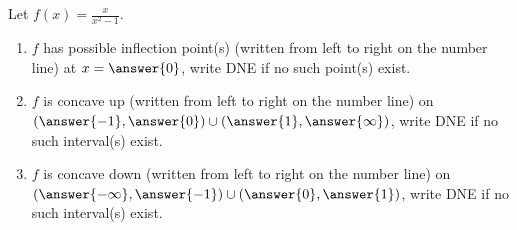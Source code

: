 \documentclass[handout]{ximera}
\author{Gregory Hartman \and Matthew Carr}
\begin{document}
\begin{exercise}






Let $f(x)=\frac{x}{x^2-1}$.
\begin{enumerate}
\item $f$ has possible inflection point(s) (written from left to right
  on the number line) at $x=\answer{0}$, write DNE if no such point(s)
  exist.
\item $f$ is concave up (written from left to right on the number
  line) on  $(\answer{-1},\answer{0})\cup(\answer{1},\answer{\infty})$,
write DNE if no such interval(s) exist.
\item $f$ is concave down (written from left to right on the number
  line) on
  $(\answer{-\infty},\answer{-1})\cup(\answer{0},\answer{1})$,
    write DNE if no such interval(s) exist.
\end{enumerate}

\end{exercise}
\end{document}
